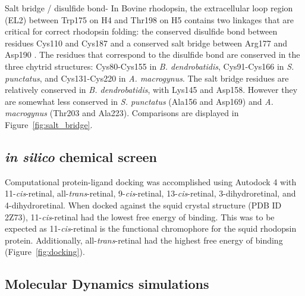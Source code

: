 \indent Salt bridge / disulfide bond- In Bovine rhodopsin, the extracellular loop region (EL2) between Trp175 on H4 and Thr198 on H5 contains two linkages that are critical for correct rhodopsin folding: the conserved disulfide bond between residues Cys110 and Cys187 and a conserved salt bridge between Arg177 and Asp190 \cite{Smith2010}. The residues that correspond to the disulfide bond are conserved in the three chytrid structures: Cys80-Cys155 in \textit{B. dendrobatidis}, Cys91-Cys166 in \textit{S. punctatus}, and Cys131-Cys220 in \textit{A. macrogynus}. The salt bridge residues are relatively conserved in \textit{B. dendrobatidis}, with Lys145 and Asp158. However they are somewhat less conserved in \textit{S. punctatus} (Ala156 and Asp169) and \textit{A. macrogynus} (Thr203 and Ala223). Comparisons are displayed in Figure~\ref{fig:salt_bridge}.
\subsection{\textit{in silico} chemical screen}
Computational protein-ligand docking was accomplished using Autodock 4 with 11-\textit{cis}-retinal, all-\textit{trans}-retinal, 9-\textit{cis}-retinal, 13-\textit{cis}-retinal, 3-dihydroretinal, and 4-dihydroretinal.  When docked against the squid crystal structure (PDB ID 2Z73), 11-\textit{cis}-retinal had the lowest free energy of binding. This was to be expected as 11-\textit{cis}-retinal is the functional chromophore for the squid rhodopsin protein. Additionally, all-\textit{trans}-retinal had the highest free energy of binding (Figure~\ref{fig:docking}).
\subsection{Molecular Dynamics simulations}
